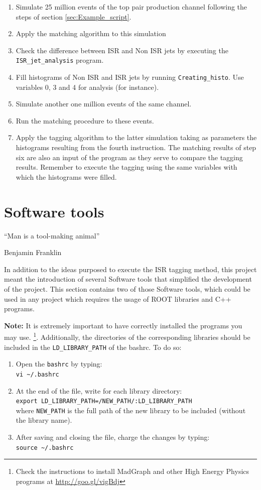 \documentclass[12pt, oneside]{book}              %
\begin{document}
\begin{enumerate}
\item Simulate 25 million events of the top pair production channel
following the steps of section \ref{sec:Example_script}.
\item Apply the matching algorithm to this simulation
\item Check the difference between ISR and Non ISR jets by executing
the \texttt{ISR\_jet\_analysis} program.
\item Fill histograms of Non ISR and ISR jets by running \texttt{Creating\_histo}.
Use variables 0, 3 and 4 for analysis (for instance).
\item Simulate another one million events of the same channel.
\item Run the matching procedure to these events.
\item Apply the tagging algorithm to the latter simulation taking
as parameters the histograms resulting from the fourth instruction. The
matching results of step six are also an input of the program as they serve
to compare the tagging results. Remember to execute the tagging using
the same variables with which the histograms were filled.
\end{enumerate}

\chapter{Software tools} \label{cha:Software_tools}

\epigraph{\textquotedblleft Man is a tool-making animal\textquotedblright}{Benjamin Franklin}

In addition to the ideas purposed to execute the ISR tagging method,
this project meant the introduction of several Software tools that
simplified the development of the project. This section contains
two of those Software tools, which could be used in any project which
requires the usage of ROOT libraries and C++ programs. 

\textbf{Note:} It is extremely important to have correctly installed
 the programs you may use. \footnote{Check the instructions to 
 	install MadGraph and other High Energy Physics programs at
 	\url{http://goo.gl/vigBdj}}. 
 Additionally, the directories of the corresponding libraries should
 be included in the \texttt{LD\_LIBRARY\_PATH} of the bashrc. To do so:
 
 \begin{enumerate}
 	\item Open the \texttt{bashrc} by typing:
	 	\\ \texttt{vi \~{}/.bashrc}
	\item At the end of the file, write for each library directory:
		\\ \texttt{export LD\_LIBRARY\_PATH=/NEW\_PATH/:LD\_LIBRARY\_PATH }
		\\ where \texttt{NEW\_PATH} is the full path of the new library
		to be included (without the library name).
	\item After saving and closing the file, charge the changes by typing:
		\\ \texttt{source \~{}/.bashrc}
 \end{enumerate}
\end{document}
